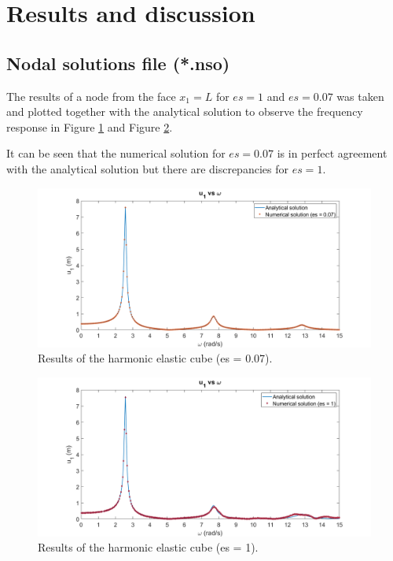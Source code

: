 \documentclass[a4]{article}
\begin{document}
\section{Results and discussion}

\subsection{Nodal solutions file (*.nso)}
The results of a node from the face $x_1=L$ for $es=1$ and $es=0.07$ was taken and plotted together with the analytical solution to observe the frequency response in Figure \ref{fig:cube_results} and Figure \ref{fig:cube_results2}.

It can be seen that the numerical solution for $es=0.07$ is in perfect agreement with the analytical solution but there are discrepancies for $es=1$.

\begin{figure}[h]
	\centering
	\includegraphics[scale = 0.45]{es007.png}
	\caption{Results of the harmonic elastic cube (es = 0.07).}
	\label{fig:cube_results}
\end{figure}

\begin{figure}[h!]
	\centering
	\includegraphics[scale = 0.45]{es1.png}
	\caption{Results of the harmonic elastic cube (es = 1).}
	\label{fig:cube_results2}
\end{figure}
\end{document}
